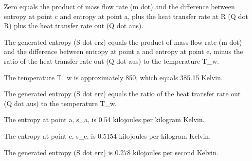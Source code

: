 Zero equals the product of mass flow rate (m dot) and the difference between entropy at point c and entropy at point a, plus the heat transfer rate at R (Q dot R) plus the heat transfer rate out (Q dot aus).

The generated entropy (S dot erz) equals the product of mass flow rate (m dot) and the difference between entropy at point a and entropy at point e, minus the ratio of the heat transfer rate out (Q dot aus) to the temperature T_w.

The temperature T_w is approximately 850, which equals 385.15 Kelvin.

The generated entropy (S dot erz) equals the ratio of the heat transfer rate out (Q dot aus) to the temperature T_w.

The entropy at point a, s_a, is 0.54 kilojoules per kilogram Kelvin.

The entropy at point e, s_e, is 0.5154 kilojoules per kilogram Kelvin.

The generated entropy (S dot erz) is 0.278 kilojoules per second Kelvin.